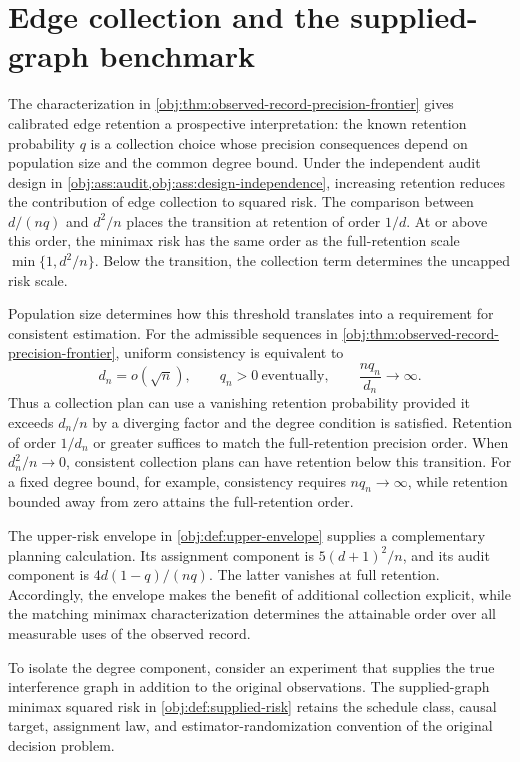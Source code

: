 \documentclass[11pt]{article}
\begin{document}
\section{Edge collection and the supplied-graph benchmark}

The characterization in \cref{obj:thm:observed-record-precision-frontier} gives calibrated edge retention a prospective interpretation: the known retention probability \(q\) is a collection choice whose precision consequences depend on population size and the common degree bound. Under the independent audit design in \cref{obj:ass:audit,obj:ass:design-independence}, increasing retention reduces the contribution of edge collection to squared risk. The comparison between \(d/(nq)\) and \(d^2/n\) places the transition at retention of order \(1/d\). At or above this order, the minimax risk has the same order as the full-retention scale \(\min\{1,d^2/n\}\). Below the transition, the collection term determines the uncapped risk scale.

Population size determines how this threshold translates into a requirement for consistent estimation. For the admissible sequences in \cref{obj:thm:observed-record-precision-frontier}, uniform consistency is equivalent to
\[
d_n=o(\sqrt n),
\qquad
q_n>0\ \text{eventually},
\qquad
\frac{nq_n}{d_n}\longrightarrow\infty.
\]
Thus a collection plan can use a vanishing retention probability provided it exceeds \(d_n/n\) by a diverging factor and the degree condition is satisfied. Retention of order \(1/d_n\) or greater suffices to match the full-retention precision order. When \(d_n^2/n\to0\), consistent collection plans can have retention below this transition. For a fixed degree bound, for example, consistency requires \(nq_n\to\infty\), while retention bounded away from zero attains the full-retention order.

The upper-risk envelope in \cref{obj:def:upper-envelope} supplies a complementary planning calculation. Its assignment component is \(5(d+1)^2/n\), and its audit component is \(4d(1-q)/(nq)\). The latter vanishes at full retention. Accordingly, the envelope makes the benefit of additional collection explicit, while the matching minimax characterization determines the attainable order over all measurable uses of the observed record.

To isolate the degree component, consider an experiment that supplies the true interference graph in addition to the original observations. The supplied-graph minimax squared risk  in \cref{obj:def:supplied-risk} retains the schedule class, causal target, assignment law, and estimator-randomization convention of the original decision problem.
\end{document}
